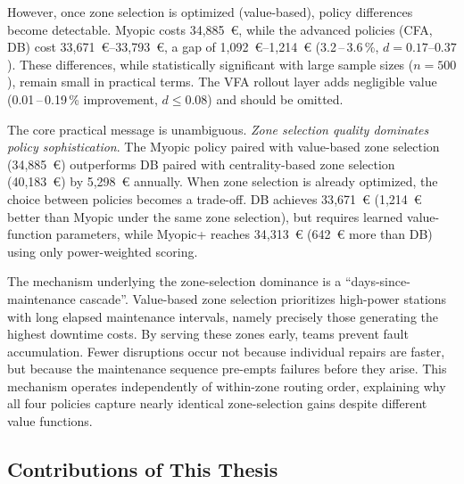 \documentclass[12pt,oneside]{article}
\begin{document}
However, once zone selection is optimized (value-based), policy differences become detectable. Myopic costs 34{,}885~€, while the advanced policies (CFA, DB) cost 33{,}671~€--33{,}793~€, a gap of 1{,}092~€--1{,}214~€ (3.2\,--\,3.6\,\%, $d = 0.17$--$0.37$). These differences, while statistically significant with large sample sizes ($n=500$), remain small in practical terms. The VFA rollout layer adds negligible value (0.01\,--\,0.19\,\% improvement, $d \leq 0.08$) and should be omitted.

The core practical message is unambiguous. \emph{Zone selection quality dominates policy sophistication}. The Myopic policy paired with value-based zone selection (34{,}885~€) outperforms DB paired with centrality-based zone selection (40{,}183~€) by 5{,}298~€ annually. When zone selection is already optimized, the choice between policies becomes a trade-off. DB achieves 33{,}671~€ (1{,}214~€ better than Myopic under the same zone selection), but requires learned value-function parameters, while Myopic+ reaches 34{,}313~€ (642~€ more than DB) using only power-weighted scoring.

The mechanism underlying the zone-selection dominance is a ``days-since-maintenance cascade''. Value-based zone selection prioritizes high-power stations with long elapsed maintenance intervals, namely precisely those generating the highest downtime costs. By serving these zones early, teams prevent fault accumulation. Fewer disruptions occur not because individual repairs are faster, but because the maintenance sequence pre-empts failures before they arise. This mechanism operates independently of within-zone routing order, explaining why all four policies capture nearly identical zone-selection gains despite different value functions.

\subsection{Contributions of This Thesis}\label{subsec_contributions_of_this_thesis}
\end{document}
